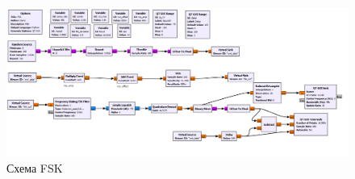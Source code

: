     \begin{landscape}
    	\begin{figure}[H]
        		\centering
        		\includegraphics[width=25.5cm]{fig/lab12/lab12_02.png}
        		\caption{Схема FSK}
        		\label{pic:fsk_scheme} %
    	\end{figure}
\end{landscape}

